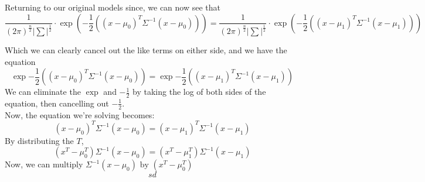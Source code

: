 \documentclass[11pt]{article}
\begin{document}
Returning to our original models since, we can now see that
\begin{equation}
\frac{1}{(2\pi) ^ \frac{n}{2}|\sum| ^ \frac{1}{2}} \cdot \exp{(-\frac{1}{2}((x - \mu_0)^T\Sigma^{-1}(x-\mu_0)))} = \frac{1}{(2\pi) ^ \frac{n}{2}|\sum| ^ \frac{1}{2}} \cdot \exp{(-\frac{1}{2}((x - \mu_1)^T\Sigma^{-1}(x-\mu_1)))}
\end{equation}

Which we can clearly cancel out the like terms on either side, and we have the equation
\begin{equation}
\exp{-\frac{1}{2}((x - \mu_0)^T\Sigma^{-1}(x-\mu_0))} = \exp{-\frac{1}{2}((x - \mu_1)^T\Sigma^{-1}(x-\mu_1))}
\end{equation}
We can eliminate the $\exp$ and $-\frac{1}{2}$ by taking the log of both sides of the equation, then cancelling out $-\frac{1}{2}$.\\
Now, the equation we're solving becomes:
\begin{equation}
(x-\mu_0)^T\Sigma^{-1}(x-\mu_0) = (x-\mu_1)^T\Sigma^{-1}(x-\mu_1)
\end{equation}
By distributing the $T$, 
\begin{equation}
(x^T-\mu^T_0)\Sigma^{-1}(x-\mu_0) = (x^T-\mu^T_1)\Sigma^{-1}(x-\mu_1)
\end{equation}
Now, we can multiply $\Sigma^{-1}(x-\mu_0) \text{ by } (x^T-\mu^T_0)$
\begin{equation}
sd
\end{equation}
\end{document}
